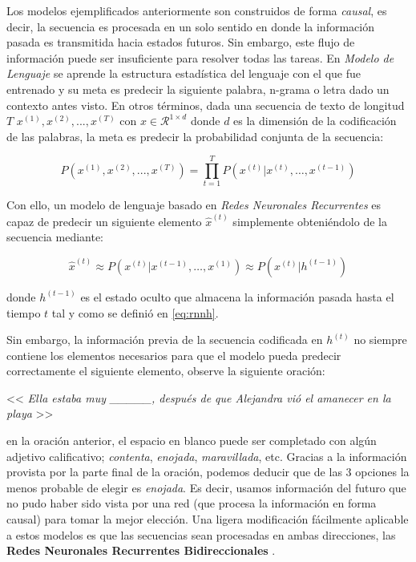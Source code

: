 Los modelos ejemplificados anteriormente son construidos de forma \textit{causal}, es
decir, la secuencia es procesada en un solo sentido en donde la información pasada es transmitida
hacia estados futuros. Sin embargo, este flujo de información puede ser insuficiente para resolver
todas las tareas. En \textit{Modelo de Lenguaje} se aprende la estructura estadística del lenguaje con el
que fue entrenado y su meta es predecir la siguiente palabra, n-grama o letra dado un contexto antes
visto. En otros términos, dada una secuencia de texto de longitud
$T$ $x^{(1)}, x^{(2)}, ..., x^{(T)}$
con $x \in \mathcal{R}^{1 \times d}$ donde $d$ es la dimensión de la codificación de las palabras,
la meta es predecir la probabilidad conjunta de la secuencia:

\begin{equation}
    P(x^{(1)}, x^{(2)}, ..., x^{(T)}) = \prod_{t=1}^{T} P(x^{(t)} | x^{(t)}, \dots , x^{(t-1)})
\end{equation}

Con ello, un modelo de lenguaje basado en \textit{Redes Neuronales Recurrentes} es capaz de predecir
un siguiente elemento $\hat x^{(t)}$ simplemente obteniéndolo de la secuencia mediante:

\begin{equation}
    \hat x^{(t)} \approx P(x^{(t)} | x^{(t-1)}, \dots, x^{(1)}) \approx P(x^{(t)} | h^{(t-1)})
\end{equation}

\noindent donde $h^{(t-1)}$ es el estado oculto que almacena la información pasada hasta el tiempo $t$
tal y como se definió en \ref{eq:rnnh}.

Sin embargo, la información previa de la secuencia codificada en $h^{(t)}$ no siempre contiene los
elementos necesarios para que el modelo pueda predecir correctamente el siguiente elemento,
observe la siguiente oración:

\begin{center}
    << \textit{Ella estaba muy \_\_\_\_\_, después de que Alejandra vió el amanecer en la playa } >>
\end{center}

\noindent en la oración anterior, el espacio en blanco puede ser completado con algún adjetivo calificativo;
\textit{contenta}, \textit{enojada}, \textit{maravillada}, etc. Gracias a la información provista por
la parte final de la oración, podemos deducir que de las 3 opciones la menos probable de
elegir es \textit{enojada}. Es decir, usamos información del futuro que no pudo haber sido vista por
una red (que procesa la información en forma causal) para tomar la mejor elección. Una ligera
modificación fácilmente aplicable a estos modelos es que las secuencias sean procesadas
en ambas direcciones, las \textbf{Redes Neuronales Recurrentes Bidireccionales}
\cite{Schuster}.

